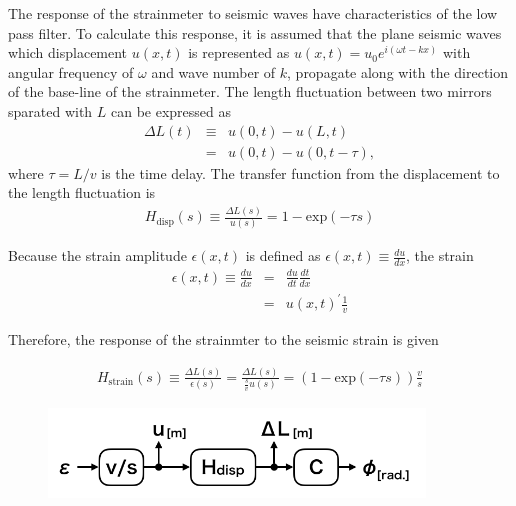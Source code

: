 The response of the strainmeter to seismic waves have characteristics of the low pass filter. To calculate this response, it is assumed that the plane seismic waves which displacement $u(x,t)$ is represented as $u(x,t)=u_0e^{i(\omega{t}-kx)}$ with angular frequency of $\omega$ and wave number of $k$, propagate along with the direction of the base-line of the strainmeter. The length fluctuation between two mirrors sparated with $L$ can be expressed as 
\begin{eqnarray}
  \Delta{L(t)} &\equiv& u(0,t) - u(L,t) \\
  &=& u(0,t) - u(0,t-\tau), \label{eq:chap2_10}
\end{eqnarray}
where $\tau=L/v$ is the time delay. 
The transfer function from the displacement to the length fluctuation is
\begin{eqnarray}
  H_{\mathrm{disp}}(s) \equiv \frac{\Delta{L(s)}}{u(s)} = 1 - \mathrm{exp}(-\tau{s})
\end{eqnarray}

Because the strain amplitude $\epsilon(x,t)$ is defined as $\epsilon(x,t)\equiv\frac{du}{dx}$, the strain
\begin{eqnarray}
  \epsilon(x,t) \equiv \frac{du}{dx} &=& \frac{du}{dt} \frac{dt}{dx}\\
  &=& {u(x,t)}^{\prime}\frac{1}{v}
\end{eqnarray}


Therefore, the response of the strainmter to the seismic strain is given

\begin{eqnarray}
  H_{\mathrm{strain}}(s) \equiv \frac{\Delta{L(s)}}{\epsilon(s)} = \frac{\Delta{L(s)}}{\frac{s}{v}u(s)} = \left(1 - \mathrm{exp}(-\tau{s})\right) \frac{v}{s}
\end{eqnarray}



\begin{figure}[h]
  \begin{center}
    \includegraphics[width=10.0cm]{./img_chap2/img211.png}
    \caption{}
  \end{center}
\end{figure}



